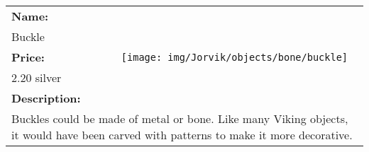 \begin{table}[ht!]
	\centering
	\begin{tabular}{ p{3cm} c }\toprule
		\textbf{Name:} & \multirow{5}{*}{\texttt{[image: img/Jorvik/objects/bone/buckle]}}\\
		Buckle & \\ 
		\textbf{Price:} & \\
		2.20 silver & \\ 
		\textbf{Description:} & \\
		\multicolumn{2}{p{12cm}}{Buckles could be made of metal or bone. Like many Viking objects, it would have been carved with patterns to make it more decorative.}\\
		\bottomrule
	\end{tabular}
\end{table}